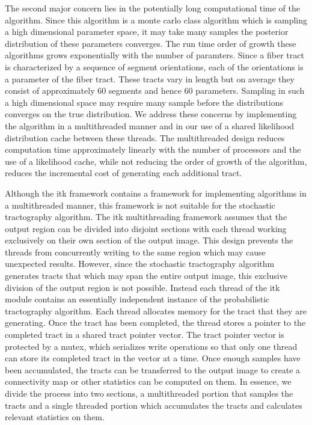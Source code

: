 The second major concern lies in the potentially long computational time of the algorithm.  Since this algorithm is a monte carlo class algorithm which is sampling a high dimensional parameter space, it may take many samples the posterior distribution of these parameters converges.  The run time order of growth these algorithms grows exponentially with the number of paramters.  Since a fiber tract is characterized by a sequence of segment orientations, each of the orientations is a parameter of the fiber tract.  These tracts vary in length but on average they consist of approximately 60 segments and hence 60 parameters.  Sampling in such a high dimensional space may require many sample before the distributions converges on the true distribution.  We address these concerns by implementing the algorithm in a multithreaded manner and in our use of a shared likelihood distribution cache between these threads.  The multithreaded design reduces computation time approximately linearly with the number of processors and the use of a likelihood cache, while not reducing the order of growth of the algorithm, reduces the incremental cost of generating each additional tract.

Although the itk framework contains a framework for implementing algorithms in a multithreaded manner, this framework is not suitable for the stochastic tractography algorithm.  The itk multithreading framework assumes that the output region can be divided into disjoint sections with each thread working exclusively on their own section of the output image.  This design prevents the threads from concurrently writing to the same region which may cause unexpected results.  However, since the stochastic tractography algorithm generates tracts that which may span the entire output image, this exclusive division of the output region is not possible.  Instead each thread of the itk module contains an essentially independent instance of the probabilistic tractography algorithm. Each thread allocates memory for the tract that they are generating.  Once the tract has been completed, the thread stores a pointer to the completed tract in a shared tract pointer vector.  The tract pointer vector is protected by a mutex, which serializes write operations so that only one thread can store its completed tract in the vector at a time.  Once enough samples have been accumulated, the tracts can be transferred to the output image to create a connectivity map or other statistics can be computed on them.  In essence, we divide the process into two sections, a multithreaded portion that samples the tracts and a single threaded portion which accumulates the tracts and calculates relevant statistics on them.

